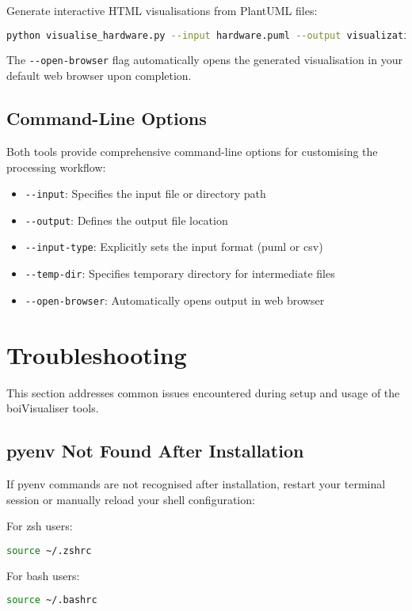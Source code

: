 \documentclass[11pt,a4paper]{article}
\begin{document}
Generate interactive HTML visualisations from PlantUML files:
\begin{lstlisting}[language=bash]
python visualise_hardware.py --input hardware.puml --output visualization.html --open-browser
\end{lstlisting}

The \texttt{-{-}open-browser} flag automatically opens the generated visualisation in your default web browser upon completion.

\subsection{Command-Line Options}

Both tools provide comprehensive command-line options for customising the processing workflow:

\begin{itemize}
\item \texttt{-{-}input}: Specifies the input file or directory path
\item \texttt{-{-}output}: Defines the output file location
\item \texttt{-{-}input-type}: Explicitly sets the input format (puml or csv)
\item \texttt{-{-}temp-dir}: Specifies temporary directory for intermediate files
\item \texttt{-{-}open-browser}: Automatically opens output in web browser
\end{itemize}

\section{Troubleshooting}

This section addresses common issues encountered during setup and usage of the boiVisualiser tools.

\subsection{pyenv Not Found After Installation}

If pyenv commands are not recognised after installation, restart your terminal session or manually reload your shell configuration:

For zsh users:
\begin{lstlisting}[language=bash]
source ~/.zshrc
\end{lstlisting}

For bash users:
\begin{lstlisting}[language=bash]
source ~/.bashrc
\end{lstlisting}
\end{document}
